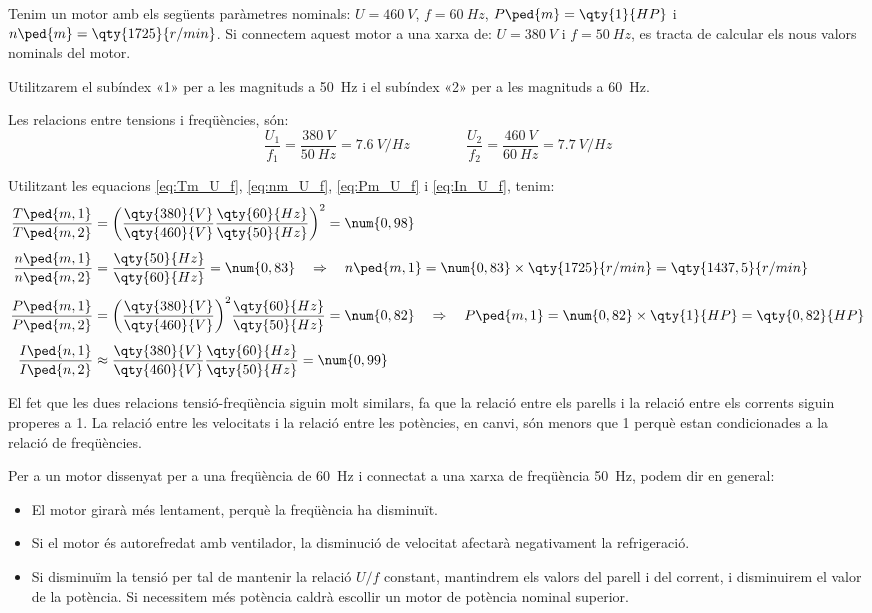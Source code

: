 \begin{exemple}[\MotorVarParamTensFreq{}]
	\addcontentsxms{\MotorVarParamTensFreq}
	Tenim un motor amb els següents paràmetres nominals: $U=\qty{460}{V}$, $f=\qty{60}{Hz}$,  $P\ped{m}=\qty{1}{HP}$ i $n\ped{m}=\qty{1725}{r/min}$. Si connectem aquest motor a una xarxa de: $U=\qty{380}{V}$ i $f=\qty{50}{Hz}$, es tracta de calcular els nous valors nominals del motor.
	
	Utilitzarem el subíndex «1» per a les magnituds  a \qty{50}{Hz} i el  subíndex «2» per a les magnituds a \qty{60}{Hz}.
	
	Les relacions entre tensions i freqüències,  són:
	\[
		\frac{U_1}{f_1} = \frac{\qty{380}{V}}{\qty{50}{Hz}} = \qty{7,6}{V/Hz} \qquad \qquad
		\frac{U_2}{f_2} = \frac{\qty{460}{V}}{\qty{60}{Hz}} = \qty{7,7}{V/Hz} 
	\]

	Utilitzant les equacions \eqref{eq:Tm_U_f},  \eqref{eq:nm_U_f}, \eqref{eq:Pm_U_f} i \eqref{eq:In_U_f},  tenim:
	\begin{align*}
		\frac{T\ped{m,1}}{T\ped{m,2}} &= {\left(\frac{\qty{380}{V}}{\qty{460}{V}}\frac{\qty{60}{Hz}}{\qty{50}{Hz}}\right)}^2 = \num{0,98} \\[1ex]
		\frac{n\ped{m,1}}{n\ped{m,2}} &= \frac{\qty{50}{Hz}}{\qty{60}{Hz}} = \num{0,83}  \quad \Rightarrow \quad n\ped{m,1} = \num{0,83} \times \qty{1725}{r/min} = \qty{1437,5}{r/min} \\[1ex]
		\frac{P\ped{m,1}}{P\ped{m,2}} &= {\left(\frac{\qty{380}{V}}{\qty{460}{V}}\right)}^{2} \frac{\qty{60}{Hz}}{\qty{50}{Hz}} = \num{0,82} \quad \Rightarrow \quad P\ped{m,1} = \num{0,82} \times \qty{1}{HP} = \qty{0,82}{HP}\\[1ex]
		\frac{I\ped{n,1}}{I\ped{n,2}} &\approx
		\frac{\qty{380}{V}}{\qty{460}{V}} \frac{\qty{60}{Hz}}{\qty{50}{Hz}} = \num{0,99}
	\end{align*}

	El fet que les dues relacions tensió-freqüència siguin molt similars, fa que la relació entre els parells i la relació entre els corrents siguin properes a 1. La relació entre les velocitats i la relació entre les potències, en canvi, són menors que 1 perquè estan condicionades a la relació de freqüències. 
\end{exemple}


Per a un motor dissenyat per a una freqüència de \qty{60}{Hz} i connectat a una xarxa de freqüència \qty{50}{Hz}, podem dir en general:
\begin{itemize}
	\item El motor girarà més lentament, perquè la freqüència ha disminuït.
	\item Si el motor és autorefredat amb ventilador, la disminució de velocitat afectarà negativament  la refrigeració.
	\item Si disminuïm la tensió  per tal de mantenir la relació $U/f$ constant, mantindrem els valors del parell i del corrent, i disminuirem el valor de la potència. Si necessitem més potència caldrà escollir un motor de potència nominal superior. 	
\end{itemize}

